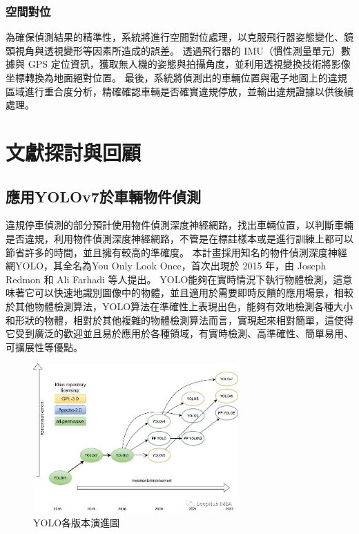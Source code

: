 \documentclass[12pt]{article}       %
\renewcommand{\figurename}{圖}                           %
\begin{document}
\subsubsection{空間對位}
\hspace{2em}為確保偵測結果的精準性，系統將進行空間對位處理，以克服飛行器姿態變化、鏡頭視角與透視變形等因素所造成的誤差。
透過飛行器的 IMU（慣性測量單元）數據與 GPS 定位資訊，獲取無人機的姿態與拍攝角度，並利用透視變換技術將影像坐標轉換為地面絕對位置。
最後，系統將偵測出的車輛位置與電子地圖上的違規區域進行重合度分析，精確確認車輛是否確實違規停放，並輸出違規證據以供後續處理。

\section{\centering 文獻探討與回顧}

\subsection{應用YOLOv7於車輛物件偵測}
\hspace{2em}違規停車偵測的部分預計使用物件偵測深度神經網路，找出車輛位置，以判斷車輛是否違規，利用物件偵測深度神經網路，不管是在標註樣本或是進行訓練上都可以節省許多的時間，並且擁有較高的準確度。
本計畫採用知名的物件偵測深度神經網YOLO，其全名為You Only Look Once，首次出現於 2015 年，由 Joseph Redmon 和 Ali Farhadi 等人提出\cite{ren_2015}。
YOLO能夠在實時情況下執行物體檢測，這意味著它可以快速地識別圖像中的物體，並且適用於需要即時反饋的應用場景，相較於其他物體檢測算法，YOLO算法在準確性上表現出色，能夠有效地檢測各種大小和形狀的物體，相對於其他複雜的物體檢測算法而言，實現起來相對簡單，這使得它受到廣泛的歡迎並且易於應用於各種領域，有實時檢測、高準確性、簡單易用、可擴展性等優點。

\begin{figure}[htbp]
    \centering
    \renewcommand{\figurename}{圖} %
    \includegraphics[width=0.7\textwidth]{yolov7_1.jpg}     %
    \caption{YOLO各版本演進圖\cite{tencent2023}}    %
    \label{fig:yolov7_1}    %
\end{figure}
\end{document}
